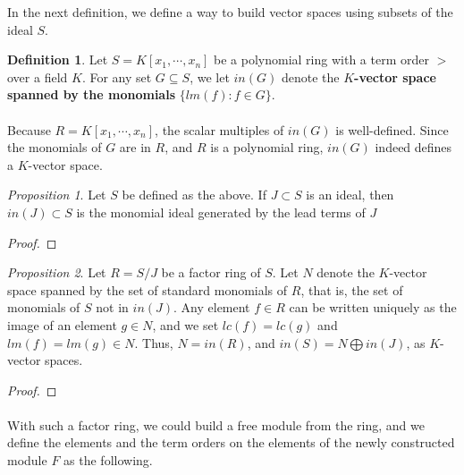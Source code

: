 \documentclass{article}
\theoremstyle{definition}
\newtheorem{definition}{Definition}[section]
\theoremstyle{remark}
\theoremstyle{example}
\newtheorem{prop}{Proposition}[section]
\begin{document}
In the next definition, we define a way to build vector spaces using subsets of the ideal $S$.

\begin{definition}
    Let $S = K[x_1,\cdots, x_n]$ be a polynomial ring with a term order $>$ over a field $K$. For any set $G \subseteq S$, we let $in(G)$ denote the \textbf{$K$-vector space spanned by the monomials} $\{lm(f):f \in G\}$.
\end{definition}

\paragraph{}

Because $R = K[x_1,\cdots,x_n]$, the scalar multiples of $in(G)$ is well-defined. Since the monomials of $G$ are in $R$, and $R$ is a polynomial ring, $in(G)$ indeed defines a $K$-vector space.

\begin{prop}
    Let $S$ be defined as the above. If $J \subset S$ is an ideal, then $in(J) \subset S$ is the monomial ideal generated by the lead terms of $J$
\end{prop}

\begin{proof}
    
\end{proof}

\begin{prop}
    Let $R = S/J$ be a factor ring of $S$. Let $N$ denote the $K$-vector space spanned by the set of standard monomials of $R$, that is, the set of monomials of $S$ not in $in(J)$. Any element $f \in R$ can be written uniquely as the image of an element $g \in N$, and we set $lc(f) = lc(g)$ and $lm(f) = lm(g) \in N$. Thus, $N = in(R)$, and $in(S) = N \bigoplus in(J)$, as $K$-vector spaces.
\end{prop}

\begin{proof}
    
\end{proof}

\paragraph{}

With such a factor ring, we could build a free module from the ring, and we define the elements and the term orders on the elements of the newly constructed module $F$ as the following.
\end{document}
